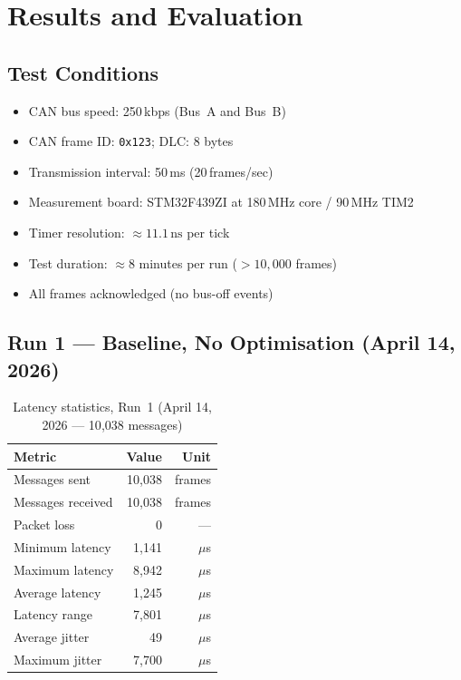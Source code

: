 \documentclass[11pt,a4paper]{article}
\begin{document}
\section{Results and Evaluation}
\label{sec:results}

\subsection{Test Conditions}

\begin{itemize}
    \item CAN bus speed: 250\,kbps (Bus~A and Bus~B)
    \item CAN frame ID: \texttt{0x123}; DLC: 8 bytes
    \item Transmission interval: 50\,ms (20\,frames/sec)
    \item Measurement board: STM32F439ZI at 180\,MHz core / 90\,MHz TIM2
    \item Timer resolution: $\approx 11.1\,\text{ns}$ per tick
    \item Test duration: $\approx 8$ minutes per run ($>10{,}000$ frames)
    \item All frames acknowledged (no bus-off events)
\end{itemize}

\subsection{Run 1 --- Baseline, No Optimisation (April 14, 2026)}

\begin{table}[H]
    \centering
    \caption{Latency statistics, Run~1 (April 14, 2026 --- 10{,}038 messages)}
    \label{tab:run1}
    \begin{tabular}{lrr}
        \toprule
        \textbf{Metric} & \textbf{Value} & \textbf{Unit} \\
        \midrule
        Messages sent     & 10{,}038 & frames \\
        Messages received & 10{,}038 & frames \\
        Packet loss       & 0        & --- \\
        \midrule
        Minimum latency   & 1{,}141  & $\mu$s \\
        Maximum latency   & 8{,}942  & $\mu$s \\
        Average latency   & 1{,}245  & $\mu$s \\
        Latency range     & 7{,}801  & $\mu$s \\
        \midrule
        Average jitter    & 49       & $\mu$s \\
        Maximum jitter    & 7{,}700  & $\mu$s \\
        \bottomrule
    \end{tabular}
\end{table}
\end{document}
